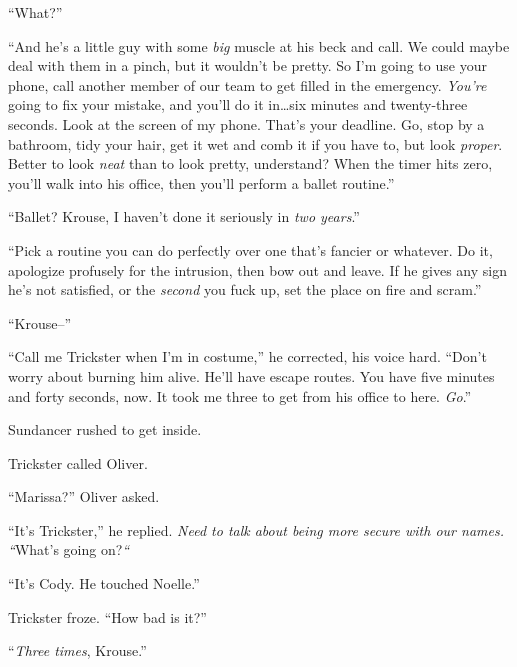 ``What?''



``And he's a little guy with some \emph{big} muscle at his beck and call.  We could maybe deal with them in a pinch, but it wouldn't be pretty.  So I'm going to use your phone, call another member of our team to get filled in the emergency.  \emph{You're} going to fix your mistake, and you'll do it in\ldots six minutes and twenty-three seconds.  Look at the screen of my phone.  That's your deadline.  Go, stop by a bathroom, tidy your hair, get it wet and comb it if you have to, but look \emph{proper}.  Better to look \emph{neat} than to look pretty, understand?  When the timer hits zero, you'll walk into his office, then you'll perform a ballet routine.''



``Ballet?  Krouse, I haven't done it seriously in \emph{two years}.''



``Pick a routine you can do perfectly over one that's fancier or whatever.  Do it, apologize profusely for the intrusion, then bow out and leave.  If he gives any sign he's not satisfied, or the \emph{second} you fuck up, set the place on fire and scram.''



``Krouse--''



``Call me Trickster when I'm in costume,'' he corrected, his voice hard.  ``Don't worry about burning him alive.  He'll have escape routes.  You have five minutes and forty seconds, now.  It took me three to get from his office to here.  \emph{Go}.''



Sundancer rushed to get inside.



Trickster called Oliver.



``Marissa?'' Oliver asked.



``It's Trickster,'' he replied.  \emph{Need to talk about being more secure with our names.  ``}What's going on?\emph{``}



``It's Cody.  He touched Noelle.''



Trickster froze.  ``How bad is it?''



``\emph{Three times}, Krouse.''



